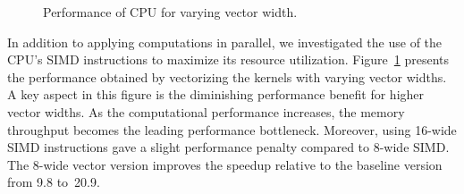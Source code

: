 \begin{figure}[tb]
\centering
{}
\caption{Performance of CPU for varying vector width.}
\label{FIG-CPU-VECTOR}
\end{figure}

In addition to applying computations in parallel, we investigated the use of
the CPU's SIMD instructions to maximize its resource utilization.
Figure~\ref{FIG-CPU-VECTOR} presents the performance obtained by vectorizing
the kernels with varying vector widths. A key aspect in this figure is the
diminishing performance benefit for higher vector widths. As the computational
performance increases, the memory throughput becomes the leading performance
bottleneck. Moreover, using 16-wide SIMD instructions gave a slight performance
penalty compared to 8-wide SIMD. The 8-wide vector version improves the speedup
relative to the baseline version from 9.8 to~20.9.

